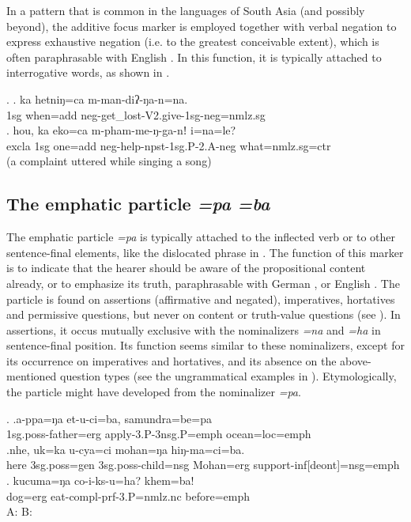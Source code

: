  
In a pattern that is common in the languages of South Asia (and possibly beyond), the additive focus marker is employed together with verbal negation to express exhaustive negation (i.e. to the greatest conceivable extent),  which is often paraphrasable with  English . In this function, it is typically attached to interrogative words, as shown in \Next.
 
 \ex. \ag. ka hetniŋ=ca m-man-diʔ-ŋa-n=na.  \\
 {\sc 1sg} when{\sc =add} {\sc neg-}get\_lost{\sc -V2.give-1sg-neg=nmlz.sg}\\
 \bg. hou,   ka       eko=ca        m-pham-me-ŋ-ga-nǃ                    i=na=le?\\
 {\sc excla} {\sc 1sg} one{\sc =add} {\sc neg-}help{\sc -npst-1sg.P-2.A-neg} what{\sc =nmlz.sg=ctr}\\
  (a complaint uttered while singing a song) 
 


\subsection{The emphatic particle \emph{=pa \ti =ba}}

The emphatic particle \emph{=pa} is typically attached to the inflected verb or to other sentence-final elements, like the dislocated phrase in \Next[a]. The function of this marker is to indicate that the hearer should be aware of the propositional content already, or to emphasize its truth, paraphrasable with German , or English . The particle is found on assertions (affirmative and negated), imperatives, hortatives and permissive questions, but never on content or truth-value questions (see \Next).  In assertions, it occus mutually exclusive with the nominalizers \emph{=na} and \emph{=ha} in sentence-final position. Its function seems similar to these nominalizers, except for its occurrence on imperatives and hortatives, and its absence on the above-mentioned question types (see the ungrammatical examples in \NNext). Etymologically, the particle might have developed from the nominalizer \emph{=pa}. 

\ex. \ag.a-ppa=ŋa et-u-ci=ba, samundra=be=pa\\
 {\sc 1sg.poss-}father{\sc =erg} apply{\sc [3sg.A;pst]-3.P-3nsg.P=emph} ocean{\sc =loc=emph}\\
  
\bg.nhe, uk=ka          u-cya=ci               mohan=ŋa      hiŋ-ma=ci=ba.\\
here {\sc 3sg.poss=gen} {\sc 3sg.poss-}child{\sc =nsg} Mohan{\sc =erg} support{\sc -inf[deont]=nsg=emph}\\
 \bg. kucuma=ŋa co-i-ks-u=ha?  khem=ba!\\
dog{\sc =erg} eat{\sc -compl-prf-3.P=nmlz.nc} before{\sc =emph}\\
 A:  B:  
  
